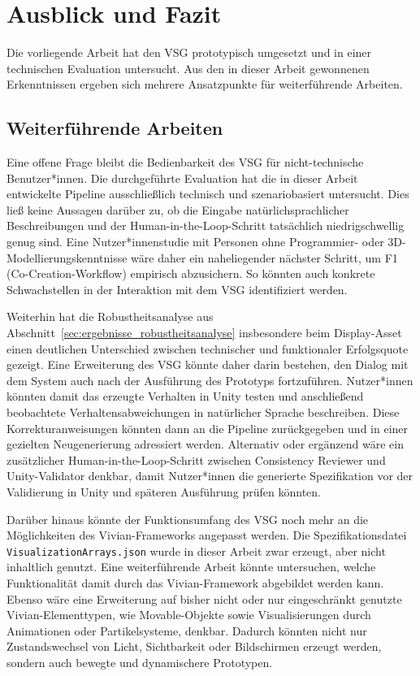 \chapter{Ausblick und Fazit}\label{ch:ausblick_fazit}

Die vorliegende Arbeit hat den VSG prototypisch umgesetzt und in einer technischen Evaluation untersucht. Aus den in dieser Arbeit gewonnenen Erkenntnissen ergeben sich mehrere Ansatzpunkte für weiterführende Arbeiten.

\section{Weiterführende Arbeiten}\label{sec:ausblick}

Eine offene Frage bleibt die Bedienbarkeit des VSG für nicht-technische Benutzer*innen. Die durchgeführte Evaluation hat die in dieser Arbeit entwickelte Pipeline ausschließlich technisch und szenariobasiert untersucht. Dies ließ keine Aussagen darüber zu, ob die Eingabe natürlichsprachlicher Beschreibungen und der Human-in-the-Loop-Schritt tatsächlich niedrigschwellig genug sind. Eine Nutzer*innenstudie mit Personen ohne Programmier- oder 3D-Modellierungskenntnisse wäre daher ein naheliegender nächster Schritt, um F1 (Co-Creation-Workflow) empirisch abzusichern. So könnten auch konkrete Schwachstellen in der Interaktion mit dem VSG identifiziert werden.

Weiterhin hat die Robustheitsanalyse aus Abschnitt~\ref{sec:ergebnisse_robustheitsanalyse} insbesondere beim Display-Asset einen deutlichen Unterschied zwischen technischer und funktionaler Erfolgsquote gezeigt. Eine Erweiterung des VSG könnte daher darin bestehen, den Dialog mit dem System auch nach der Ausführung des Prototyps fortzuführen. Nutzer*innen könnten damit das erzeugte Verhalten in Unity testen und anschließend beobachtete Verhaltensabweichungen in natürlicher Sprache beschreiben. Diese Korrekturanweisungen könnten dann an die Pipeline zurückgegeben und in einer gezielten Neugenerierung adressiert werden. Alternativ oder ergänzend wäre ein zusätzlicher Human-in-the-Loop-Schritt zwischen Consistency Reviewer und Unity-Validator denkbar, damit Nutzer*innen die generierte Spezifikation vor der Validierung in Unity und späteren Ausführung prüfen könnten.

Darüber hinaus könnte der Funktionsumfang des VSG noch mehr an die Möglichkeiten des Vivian-Frameworks angepasst werden. Die Spezifikationsdatei \texttt{VisualizationArrays.json} wurde in dieser Arbeit zwar erzeugt, aber nicht inhaltlich genutzt. Eine weiterführende Arbeit könnte untersuchen, welche Funktionalität damit durch das Vivian-Framework abgebildet werden kann. Ebenso wäre eine Erweiterung auf bisher nicht oder nur eingeschränkt genutzte Vivian-Elementtypen, wie Movable-Objekte sowie Visualisierungen durch Animationen oder Partikelsysteme, denkbar. Dadurch könnten nicht nur Zustandswechsel von Licht, Sichtbarkeit oder Bildschirmen erzeugt werden, sondern auch bewegte und dynamischere Prototypen.

